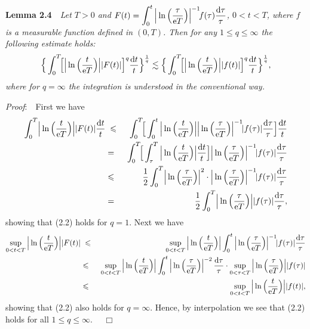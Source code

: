 \documentclass[11pt]{article}
\newcommand{\rmd}{\mbox{\rm d}}
\newcommand{\rme}{{\rm e}}
\begin{document}
  {\bf Lemma 2.4}\ \ {\em Let $T>0$ and $F(t)=\displaystyle\int_0^t\Big|\ln\Big(\frac{\tau}{\rme T}\Big)\Big|^{-1}\!f(\tau)\frac{\rmd\tau}{\tau}$,
  $0<t<T$, where $f$ is a measurable function defined in $(0,T)$. Then for any $1\leqslant q\leqslant\infty$ the following estimate holds:
\begin{equation}
  \Big\{\int_0^T\!\!\Big[\Big|\ln\Big(\frac{t}{\rme T}\Big)\Big||F(t)|\Big]^q\frac{\rmd t}{t}\Big\}^{\frac{1}{q}}\lesssim
  \Big\{\int_0^T\!\!\Big[\Big|\ln\Big(\frac{t}{\rme T}\Big)\Big||f(t)|\Big]^q\frac{\rmd t}{t}\Big\}^{\frac{1}{q}},
\end{equation}
  where for $q=\infty$ the integration is understood in the conventional way.}
\medskip

  {\em Proof}:\ \ First we have
\begin{eqnarray*}
  \int_0^T\!\Big|\ln\Big(\frac{t}{\rme T}\Big)\Big||F(t)|\frac{\rmd t}{t}&\;\leqslant\;&
  \int_0^T\!\!\Big[\int_0^t\Big|\ln\Big(\frac{t}{\rme T}\Big)\Big|\Big|\ln\Big(\frac{\tau}{\rme T}\Big)\Big|^{-1}\!|f(\tau)|\frac{\rmd\tau}{\tau}
  \Big]\frac{\rmd t}{t}
\\
  &=&\int_0^T\!\!\Big[\int_{\tau}^T\Big|\ln\Big(\frac{t}{\rme T}\Big)\Big|\frac{\rmd t}{t}\Big]
  \Big|\ln\Big(\frac{\tau}{\rme T}\Big)\Big|^{-1}\!|f(\tau)|\frac{\rmd\tau}{\tau}
\\
  &\leqslant&\frac{1}{2}\int_0^T\!\Big|\ln\Big(\frac{\tau}{\rme T}\Big)\Big|^2\cdot\Big|\ln\Big(\frac{\tau}{\rme T}\Big)\Big|^{-1}\!
  |f(\tau)|\frac{\rmd\tau}{\tau}
\\
  &=&\frac{1}{2}\int_0^T\!\Big|\ln\Big(\frac{\tau}{\rme T}\Big)\Big||f(\tau)|\frac{\rmd\tau}{\tau},
\end{eqnarray*}
  showing that (2.2) holds for $q=1$. Next we have
\begin{eqnarray*}
  \sup_{0<t<T}\Big|\ln\Big(\frac{t}{\rme T}\Big)\Big||F(t)|&\;\leqslant\;&
  \sup_{0<t<T}\Big|\ln\Big(\frac{t}{\rme T}\Big)\Big|\int_0^t\Big|\ln\Big(\frac{\tau}{\rme T}\Big)\Big|^{-1}\!|f(\tau)|\frac{\rmd\tau}{\tau}
\\
  &\leqslant&\sup_{0<t<T}\Big|\ln\Big(\frac{t}{\rme T}\Big)\Big|\int_0^t\Big|\ln\Big(\frac{\tau}{\rme T}\Big)\Big|^{-2}\,\frac{\rmd\tau}{\tau}
  \cdot\sup_{0<\tau<T}\Big|\ln\Big(\frac{\tau}{\rme T}\Big)\Big||f(\tau)|
\\
  &\leqslant&\sup_{0<t<T}\Big|\ln\Big(\frac{t}{\rme T}\Big)\Big||f(t)|,
\end{eqnarray*}
  showing that (2.2) also holds for $q=\infty$. Hence, by interpolation we see that (2.2) holds for all $1\leqslant q\leqslant\infty$. $\quad\Box$
\medskip
\end{document}
